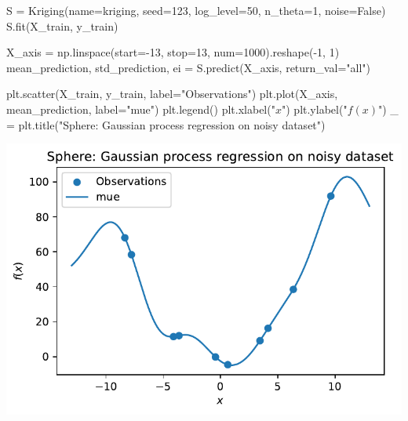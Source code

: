 \documentclass[
  letterpaper,
  DIV=11,
  numbers=noendperiod]{scrreprt}
\newenvironment{Shaded}{\begin{snugshade}}{\end{snugshade}}
\newcommand{\DecValTok}[1]{\textcolor[rgb]{0.68,0.00,0.00}{#1}}
\newcommand{\NormalTok}[1]{\textcolor[rgb]{0.00,0.23,0.31}{#1}}
\newcommand{\OperatorTok}[1]{\textcolor[rgb]{0.37,0.37,0.37}{#1}}
\newcommand{\StringTok}[1]{\textcolor[rgb]{0.13,0.47,0.30}{#1}}
\newcommand{\VariableTok}[1]{\textcolor[rgb]{0.07,0.07,0.07}{#1}}
\begin{document}
\begin{Shaded}
\begin{Highlighting}[]
\NormalTok{S }\OperatorTok{=}\NormalTok{ Kriging(name}\OperatorTok{=}\StringTok{\textquotesingle{}kriging\textquotesingle{}}\NormalTok{,}
\NormalTok{            seed}\OperatorTok{=}\DecValTok{123}\NormalTok{,}
\NormalTok{            log\_level}\OperatorTok{=}\DecValTok{50}\NormalTok{,}
\NormalTok{            n\_theta}\OperatorTok{=}\DecValTok{1}\NormalTok{,}
\NormalTok{            noise}\OperatorTok{=}\VariableTok{False}\NormalTok{)}
\NormalTok{S.fit(X\_train, y\_train)}

\NormalTok{X\_axis }\OperatorTok{=}\NormalTok{ np.linspace(start}\OperatorTok{={-}}\DecValTok{13}\NormalTok{, stop}\OperatorTok{=}\DecValTok{13}\NormalTok{, num}\OperatorTok{=}\DecValTok{1000}\NormalTok{).reshape(}\OperatorTok{{-}}\DecValTok{1}\NormalTok{, }\DecValTok{1}\NormalTok{)}
\NormalTok{mean\_prediction, std\_prediction, ei }\OperatorTok{=}\NormalTok{ S.predict(X\_axis, return\_val}\OperatorTok{=}\StringTok{"all"}\NormalTok{)}

\NormalTok{plt.scatter(X\_train, y\_train, label}\OperatorTok{=}\StringTok{"Observations"}\NormalTok{)}
\NormalTok{plt.plot(X\_axis, mean\_prediction, label}\OperatorTok{=}\StringTok{"mue"}\NormalTok{)}
\NormalTok{plt.legend()}
\NormalTok{plt.xlabel(}\StringTok{"$x$"}\NormalTok{)}
\NormalTok{plt.ylabel(}\StringTok{"$f(x)$"}\NormalTok{)}
\NormalTok{\_ }\OperatorTok{=}\NormalTok{ plt.title(}\StringTok{"Sphere: Gaussian process regression on noisy dataset"}\NormalTok{)}
\end{Highlighting}
\end{Shaded}

\includegraphics{014_num_spot_ocba_files/figure-pdf/cell-10-output-1.pdf}
\end{document}

